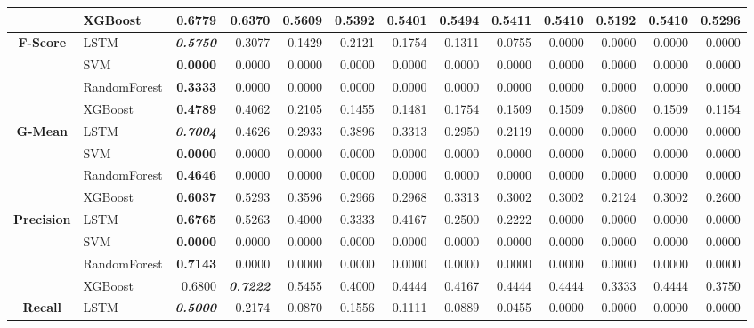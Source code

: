 \begin{table}[H]
\begin{adjustbox}{max width=12cm}
\begin{tabular}{|c|l|r|r|r|r|r|r|r|r|r|r|r|}
		&  XGBoost & \textbf{  0.6779 } &  0.6370 &  0.5609 &  0.5392 &  0.5401 &  0.5494 &  0.5411 &  0.5410 &  0.5192 &  0.5410 &  0.5296 \\
		\hline
		\textbf{F-Score} &  LSTM & \textit{ \textbf{  0.5750 } } &  0.3077 &  0.1429 &  0.2121 &  0.1754 &  0.1311 &  0.0755 &  0.0000 &  0.0000 &  0.0000 &  0.0000 \\
		&  SVM & \textbf{  0.0000 } &  0.0000 &  0.0000 &  0.0000 &  0.0000 &  0.0000 &  0.0000 &  0.0000 &  0.0000 &  0.0000 &  0.0000 \\
		&  RandomForest & \textbf{  0.3333 } &  0.0000 &  0.0000 &  0.0000 &  0.0000 &  0.0000 &  0.0000 &  0.0000 &  0.0000 &  0.0000 &  0.0000 \\
		&  XGBoost & \textbf{  0.4789 } &  0.4062 &  0.2105 &  0.1455 &  0.1481 &  0.1754 &  0.1509 &  0.1509 &  0.0800 &  0.1509 &  0.1154 \\
		\hline
		\textbf{G-Mean} &  LSTM & \textit{ \textbf{  0.7004 } } &  0.4626 &  0.2933 &  0.3896 &  0.3313 &  0.2950 &  0.2119 &  0.0000 &  0.0000 &  0.0000 &  0.0000 \\
		&  SVM & \textbf{  0.0000 } &  0.0000 &  0.0000 &  0.0000 &  0.0000 &  0.0000 &  0.0000 &  0.0000 &  0.0000 &  0.0000 &  0.0000 \\
		&  RandomForest & \textbf{  0.4646 } &  0.0000 &  0.0000 &  0.0000 &  0.0000 &  0.0000 &  0.0000 &  0.0000 &  0.0000 &  0.0000 &  0.0000 \\
		&  XGBoost & \textbf{  0.6037 } &  0.5293 &  0.3596 &  0.2966 &  0.2968 &  0.3313 &  0.3002 &  0.3002 &  0.2124 &  0.3002 &  0.2600 \\
		\hline
		\textbf{Precision} &  LSTM & \textbf{  0.6765 } &  0.5263 &  0.4000 &  0.3333 &  0.4167 &  0.2500 &  0.2222 &  0.0000 &  0.0000 &  0.0000 &  0.0000 \\
		&  SVM & \textbf{  0.0000 } &  0.0000 &  0.0000 &  0.0000 &  0.0000 &  0.0000 &  0.0000 &  0.0000 &  0.0000 &  0.0000 &  0.0000 \\
		&  RandomForest & \textbf{  0.7143 } &  0.0000 &  0.0000 &  0.0000 &  0.0000 &  0.0000 &  0.0000 &  0.0000 &  0.0000 &  0.0000 &  0.0000 \\
		&  XGBoost &  0.6800 & \textit{ \textbf{  0.7222 } } &  0.5455 &  0.4000 &  0.4444 &  0.4167 &  0.4444 &  0.4444 &  0.3333 &  0.4444 &  0.3750 \\
		\hline
		\textbf{Recall} &  LSTM & \textit{ \textbf{  0.5000 } } &  0.2174 &  0.0870 &  0.1556 &  0.1111 &  0.0889 &  0.0455 &  0.0000 &  0.0000 &  0.0000 &  0.0000 \\

\end{tabular}
\end{adjustbox}
\end{table}
